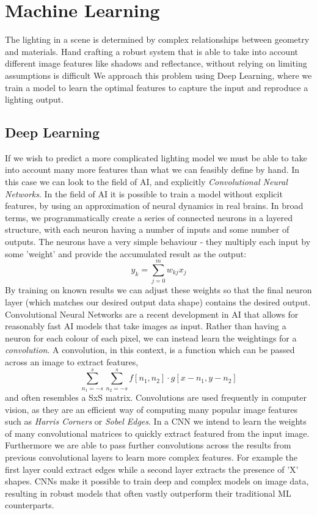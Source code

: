 \documentclass[ %
                    author={Gavin Parker},
                supervisor={Dr. Neill Campbell},
                    degree={MEng},
                     title={Deep Siamese Networks for Illumination Estimation from Stereo Images},
                  subtitle={},
                      type={research},
                      year={2018} ]{dissertation}
\begin{document}
\section{Machine Learning}
The lighting in a scene is determined by complex relationships between geometry and materials. Hand crafting a robust system that is able to take into account different image features like shadows and reflectance, without relying on limiting assumptions is difficult We approach this problem using Deep Learning, where we train a model to learn the optimal features to capture the input and reproduce a lighting output.
\newline
\subsection{Deep Learning}
If we wish to predict a more complicated lighting model we must be able to take into account many more features than what we can feasibly define by hand. In this case we can look to the field of AI, and explicitly \textit{Convolutional Neural Networks}. In the field of AI it is possible to train a model without explicit features, by using an approximation of neural dynamics in real brains. In broad terms, we programmatically create a series of connected neurons in a layered structure, with each neuron having a number of inputs and some number of outputs. The neurons have a very simple behaviour - they multiply each input by some 'weight' and provide the accumulated result as the output:
\[y_k = \sum_{j=0}^{m}{w_{kj}x_j}\]
By training on known results we can adjust these weights so that the final neuron layer (which matches our desired output data shape) contains the desired output.
\newline
Convolutional Neural Networks are a recent development in AI that allows for reasonably fast AI models that take images as input. Rather than having a neuron for each colour of each pixel, we can instead learn the weightings for a \textit{convolution}. A convolution, in this context, is a function which can be passed across an image to extract features,
\[\sum_{n_1=-s}^{s}{\sum_{n_2=-s}^{s}{f[n_1, n_2]\cdot g[x-n_1,y-n_2]}} \]
and often resembles a SxS matrix. Convolutions are used frequently in computer vision, as they are an efficient way of computing many popular image features such as \textit{Harris Corners} or \textit{Sobel Edges}. In a CNN we intend to learn the weights of many convolutional matrices to quickly extract featured from the input image. Furthermore we are able to pass further convolutions across the results from previous convolutional layers to learn more complex features. For example the first layer could extract edges while a second layer extracts the presence of 'X' shapes. CNNs make it possible to train deep and complex models on image data, resulting in robust models that often vastly outperform their traditional ML counterparts.
\end{document}

